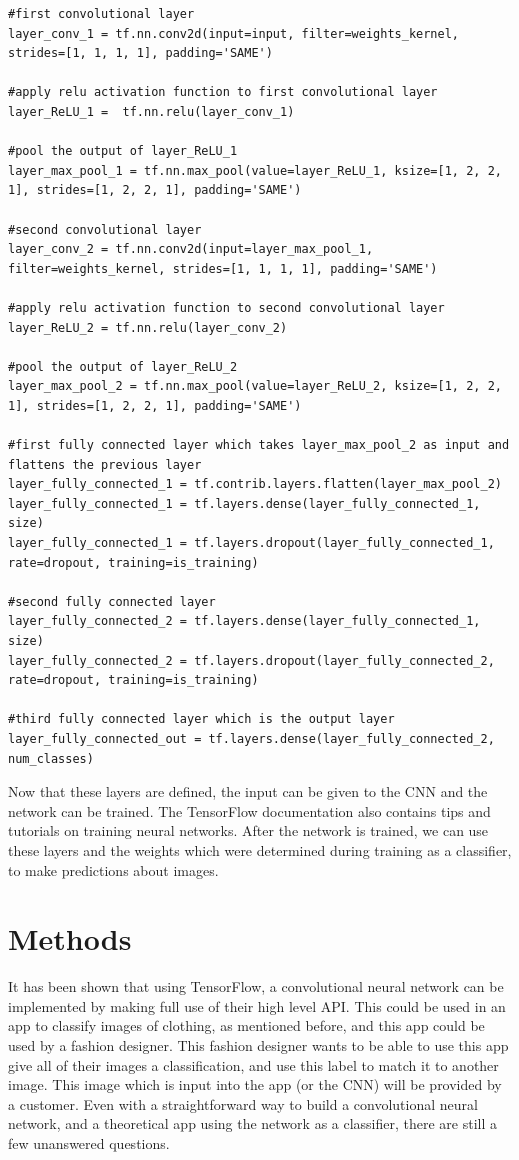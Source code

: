 \documentclass[12pt]{report} %
\begin{document}
\begin{lstlisting}
#first convolutional layer
layer_conv_1 = tf.nn.conv2d(input=input, filter=weights_kernel, strides=[1, 1, 1, 1], padding='SAME')

#apply relu activation function to first convolutional layer
layer_ReLU_1 =  tf.nn.relu(layer_conv_1)

#pool the output of layer_ReLU_1
layer_max_pool_1 = tf.nn.max_pool(value=layer_ReLU_1, ksize=[1, 2, 2, 1], strides=[1, 2, 2, 1], padding='SAME')

#second convolutional layer
layer_conv_2 = tf.nn.conv2d(input=layer_max_pool_1, filter=weights_kernel, strides=[1, 1, 1, 1], padding='SAME')

#apply relu activation function to second convolutional layer
layer_ReLU_2 = tf.nn.relu(layer_conv_2)

#pool the output of layer_ReLU_2
layer_max_pool_2 = tf.nn.max_pool(value=layer_ReLU_2, ksize=[1, 2, 2, 1], strides=[1, 2, 2, 1], padding='SAME')

#first fully connected layer which takes layer_max_pool_2 as input and flattens the previous layer
layer_fully_connected_1 = tf.contrib.layers.flatten(layer_max_pool_2)
layer_fully_connected_1 = tf.layers.dense(layer_fully_connected_1, size)
layer_fully_connected_1 = tf.layers.dropout(layer_fully_connected_1, rate=dropout, training=is_training)

#second fully connected layer
layer_fully_connected_2 = tf.layers.dense(layer_fully_connected_1, size)
layer_fully_connected_2 = tf.layers.dropout(layer_fully_connected_2, rate=dropout, training=is_training)

#third fully connected layer which is the output layer
layer_fully_connected_out = tf.layers.dense(layer_fully_connected_2, num_classes)
\end{lstlisting}

	Now that these layers are defined, the input can be given to the CNN and the network can be trained. The TensorFlow documentation also contains tips and tutorials on training neural networks\cite{tensorFlow}. After the network is trained, we can use these layers and the weights which were determined during training as a classifier, to make predictions about images.
	
\chapter{Methods}
	It has been shown that using TensorFlow, a convolutional neural network can be implemented by making full use of their high level API. This could be used in an app to classify images of clothing, as mentioned before, and this app could be used by a fashion designer. This fashion designer wants to be able to use this app give all of their images a classification, and use this label to match it to another image. This image which is input into the app (or the CNN) will be provided by a customer. Even with a straightforward way to build a convolutional neural network, and a theoretical app using the network as a classifier, there are still a few unanswered questions.
	
\end{document}
